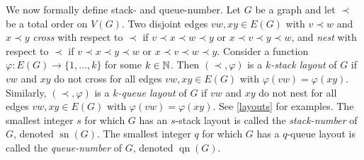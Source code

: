 \documentclass[kpfonts]{patmorin}
\DeclareMathOperator{\sn}{sn}
\DeclareMathOperator{\qn}{qn}
\begin{document}
We now formally define stack- and queue-number. Let $G$ be a graph and let $\prec$ be a total order on $V(G)$.  Two disjoint edges $vw,xy\in E(G)$ with $v\prec w$ and $x\prec y$ \emph{cross} with respect to $\prec$ if $v\prec x\prec w\prec y$ or $x\prec v\prec y\prec w$, and \emph{nest} with respect to $\prec$ if $v\prec x\prec y\prec w$ or $x\prec v\prec w\prec y$. Consider a function $\varphi:E(G)\to\{1,\ldots,k\}$ for some $k\in\mathbb{N}$. Then $(\prec,\varphi)$ is a \emph{$k$-stack layout} of $G$ if $vw$ and $xy$ do not cross for all edges $vw,xy\in E(G)$ with $\varphi(vw) = \varphi(xy)$. Similarly, $(\prec,\varphi)$ is a \emph{$k$-queue layout} of $G$ if $vw$ and $xy$ do not nest for all edges $vw,xy\in E(G)$ with  $\varphi(vw)=\varphi(xy)$. See \cref{layouts} for examples. The smallest integer $s$ for which $G$ has an $s$-stack layout is called the \emph{stack-number} of $G$, denoted  $\sn(G)$. The smallest integer $q$ for which $G$ has a $q$-queue layout is called the \emph{queue-number} of $G$, denoted $\qn(G)$.
\end{document}
